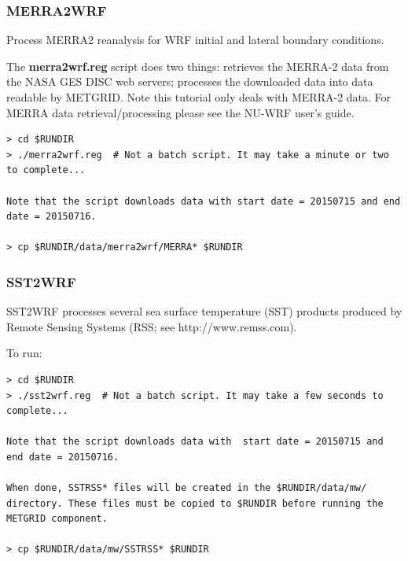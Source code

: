 \begin{frame}[fragile]\frametitle{MERRA2WRF}

\footnotesize{Process MERRA2 reanalysis for WRF initial and lateral boundary conditions}.\\
\hrulefill\par
\footnotesize{
The \textbf{merra2wrf.reg} script does two things: retrieves the MERRA-2 data from the NASA GES DISC web servers; processes the downloaded data into data readable by METGRID. Note this tutorial only deals with MERRA-2 data. For MERRA data retrieval/processing please see the NU-WRF user's guide.}\\
\hrulefill\par
\begin{lstlisting}
> cd $RUNDIR
> ./merra2wrf.reg  # Not a batch script. It may take a minute or two to complete...

Note that the script downloads data with start date = 20150715 and end date = 20150716.

> cp $RUNDIR/data/merra2wrf/MERRA* $RUNDIR
\end{lstlisting}

\end{frame}

\begin{frame}[fragile]
\frametitle{SST2WRF}

\footnotesize{
SST2WRF processes several sea surface temperature (SST) products produced by Remote Sensing Systems (RSS; see http://www.remss.com).\\
}    
\hrulefill\par
\footnotesize{To run:}
\begin{lstlisting}
> cd $RUNDIR
> ./sst2wrf.reg  # Not a batch script. It may take a few seconds to complete...

Note that the script downloads data with  start date = 20150715 and end date = 20150716.

When done, SSTRSS* files will be created in the $RUNDIR/data/mw/ directory. These files must be copied to $RUNDIR before running the METGRID component. 

> cp $RUNDIR/data/mw/SSTRSS* $RUNDIR
\end{lstlisting}

\end{frame}

